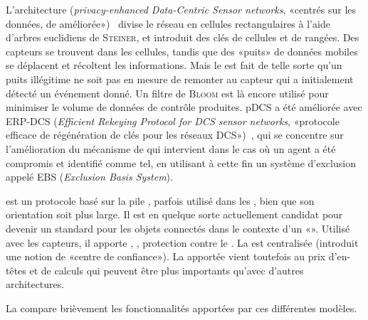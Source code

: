 L'architecture  (\textit{privacy-enhanced Data-Centric Sensor networks}, «\rcs centrés sur les données, de  améliorée»)~\cite{SZZCY09} divise le réseau en cellules rectangulaires à l'aide d'arbres euclidiens de \textsc{Steiner}, et introduit des clés de cellules et de rangées.
Des capteurs se trouvent dans les cellules, tandis que des «puits» de données mobiles se déplacent et récoltent les informations.
Mais le  est fait de telle sorte qu'un puits illégitime ne soit pas en mesure de remonter au capteur qui a initialement détecté un événement donné.
Un filtre de \textsc{Bloom} est là encore utilisé pour minimiser le volume de données de contrôle produites.
pDCS a été améliorée avec ERP-DCS (\textit{Efficient Rekeying Protocol for DCS sensor networks}, «protocole efficace de régénération de clés pour les réseaux DCS»)~\cite{HYD13}, qui se concentre sur l'amélioration du mécanisme de  qui intervient dans le cas où un agent a été compromis et identifié comme tel, en utilisant à cette fin un système d'exclusion appelé EBS (\textit{Exclusion Basis System}).

\zigbee\cite{zigbee} est un protocole basé sur la pile \ieeeff, parfois utilisé dans les \rcs, bien que son orientation soit plus large.
Il est en quelque sorte actuellement candidat pour devenir un standard pour les objets connectés dans le contexte d'un «».
Utilisé avec les capteurs, il apporte , , protection contre le .
La  est centralisée (\zigbee introduit une notion de «centre de confiance»).
La \secu apportée vient toutefois au prix d'en-têtes et de calculs qui peuvent être plus importants qu'avec d'autres architectures.

La  compare brièvement les fonctionnalités apportées par ces différentes modèles.

